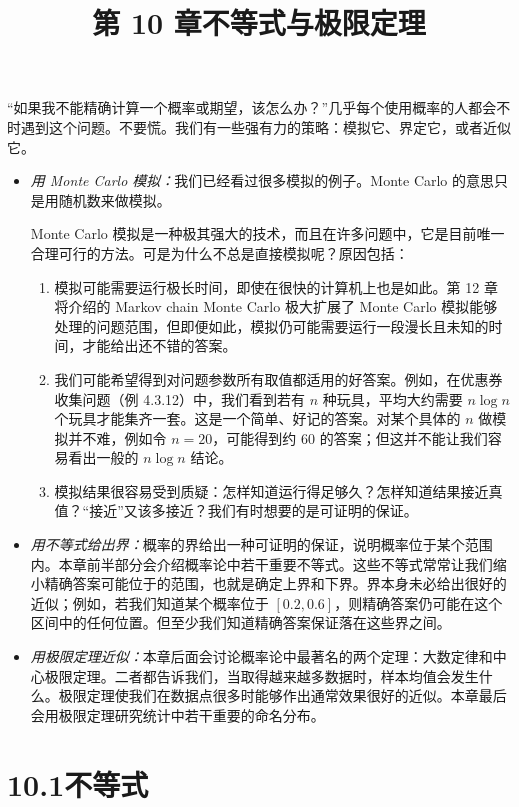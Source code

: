 \documentclass[UTF8,12pt,a4paper,fontset=fandol]{ctexart}
\title{第 10 章\quad 不等式与极限定理}
\author{}
\date{}
\begin{document}
\maketitle

“如果我不能精确计算一个概率或期望，该怎么办？”几乎每个使用概率的人都会不时遇到这个问题。不要慌。我们有一些强有力的策略：模拟它、界定它，或者近似它。

\begin{itemize}
  \item \textit{用 Monte Carlo 模拟：}我们已经看过很多模拟的例子。Monte Carlo 的意思只是用随机数来做模拟。

  Monte Carlo 模拟是一种极其强大的技术，而且在许多问题中，它是目前唯一合理可行的方法。可是为什么不总是直接模拟呢？原因包括：
  \begin{enumerate}
    \item 模拟可能需要运行极长时间，即使在很快的计算机上也是如此。第 12 章将介绍的 Markov chain Monte Carlo 极大扩展了 Monte Carlo 模拟能够处理的问题范围，但即便如此，模拟仍可能需要运行一段漫长且未知的时间，才能给出还不错的答案。
    \item 我们可能希望得到对问题参数所有取值都适用的好答案。例如，在优惠券收集问题（例 4.3.12）中，我们看到若有 $n$ 种玩具，平均大约需要 $n\log n$ 个玩具才能集齐一套。这是一个简单、好记的答案。对某个具体的 $n$ 做模拟并不难，例如令 $n=20$，可能得到约 $60$ 的答案；但这并不能让我们容易看出一般的 $n\log n$ 结论。
    \item 模拟结果很容易受到质疑：怎样知道运行得足够久？怎样知道结果接近真值？“接近”又该多接近？我们有时想要的是可证明的保证。
  \end{enumerate}

  \item \textit{用不等式给出界：}概率的界给出一种可证明的保证，说明概率位于某个范围内。本章前半部分会介绍概率论中若干重要不等式。这些不等式常常让我们缩小精确答案可能位于的范围，也就是确定上界和下界。界本身未必给出很好的近似；例如，若我们知道某个概率位于 $[0.2,0.6]$，则精确答案仍可能在这个区间中的任何位置。但至少我们知道精确答案保证落在这些界之间。

  \item \textit{用极限定理近似：}本章后面会讨论概率论中最著名的两个定理：大数定律和中心极限定理。二者都告诉我们，当取得越来越多数据时，样本均值会发生什么。极限定理使我们在数据点很多时能够作出通常效果很好的近似。本章最后会用极限定理研究统计中若干重要的命名分布。
\end{itemize}

\section*{10.1\quad 不等式}
\end{document}

